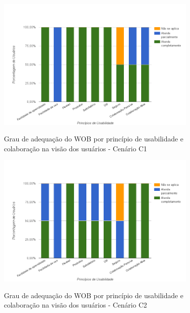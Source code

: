 \begin{figure}[!htb]
    \centering
    \caption{Grau de adequação do WOB por princípio de usabilidade e colaboração na visão dos usuários - Cenário C1}
    \includegraphics[width=0.87\textwidth]{./04-figuras/avaliacao-cenario1}
    \label{fig:avaliacao-cenario1}
\end{figure}

\begin{figure}[!htb]
    \centering
    \caption{Grau de adequação do WOB por princípio de usabilidade e colaboração na visão dos usuários - Cenário C2}
    \includegraphics[width=0.87\textwidth]{./04-figuras/avaliacao-cenario2}
    \label{fig:avaliacao-cenario2}
\end{figure} 

